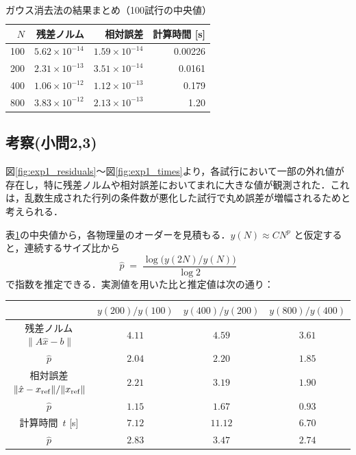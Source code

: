 \documentclass[a4paper,11pt]{ltjsarticle}
\begin{document}
\begin{table}[H]
\centering
\caption{ガウス消去法の結果まとめ（100試行の中央値）}
\label{tab:exp1_summary}
\begin{tabular}{r|r|r|r}
\hline
$N$ & 残差ノルム & 相対誤差 & 計算時間 [s] \\
\hline
100 & $5.62\times10^{-14}$ & $1.59\times10^{-14}$ & 0.00226 \\
200 & $2.31\times10^{-13}$ & $3.51\times10^{-14}$ & 0.0161 \\
400 & $1.06\times10^{-12}$ & $1.12\times10^{-13}$ & 0.179 \\
800 & $3.83\times10^{-12}$ & $2.13\times10^{-13}$ & 1.20 \\
\hline
\end{tabular}
\end{table}



\subsection{考察(小問2,3)}

図\ref{fig:exp1_residuals}〜図\ref{fig:exp1_times}より，各試行において一部の外れ値が存在し，特に残差ノルムや相対誤差においてまれに大きな値が観測された．これは，乱数生成された行列の条件数が悪化した試行で丸め誤差が増幅されるためと考えられる．

表\ref{tab:exp1_summary}の中央値から，各物理量のオーダーを見積もる．$y(N)\approx C N^p$ と仮定すると，連続するサイズ比から
\[
\hat p\;=\;\frac{\log\bigl(y(2N)/y(N)\bigr)}{\log 2}
\]
で指数を推定できる．実測値を用いた比と推定値は次の通り：

\begin{center}
\begin{tabular}{c|ccc}
& $y(200)/y(100)$ & $y(400)/y(200)$ & $y(800)/y(400)$ \\
\hline
残差ノルム $\,\|A\hat x-b\|$ & $4.11$ & $4.59$ & $3.61$ \\
$\hat p$ & $2.04$ & $2.20$ & $1.85$ \\
\hline
相対誤差 $\,\|\hat x-x_{\rm ref}\|/\|x_{\rm ref}\|$ & $2.21$ & $3.19$ & $1.90$ \\
$\hat p$ & $1.15$ & $1.67$ & $0.93$ \\
\hline
計算時間 $\,t$ [s] & $7.12$ & $11.12$ & $6.70$ \\
$\hat p$ & $2.83$ & $3.47$ & $2.74$ \\
\end{tabular}
\end{center}
\end{document}

